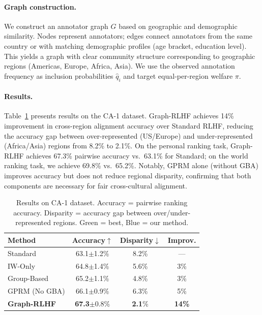 \documentclass{article}
\theoremstyle{plain}
\theoremstyle{definition}
\theoremstyle{remark}
\begin{document}
\paragraph{Graph construction.}
We construct an annotator graph $G$ based on geographic and demographic similarity. Nodes represent annotators; edges connect annotators from the same country or with matching demographic profiles (age bracket, education level). This yields a graph with clear community structure corresponding to geographic regions (Americas, Europe, Africa, Asia). We use the observed annotation frequency as inclusion probabilities $\hat{q}_i$ and target equal-per-region welfare $\pi$.

\paragraph{Results.}
Table~\ref{tab:ca1-results} presents results on the CA-1 dataset. Graph-RLHF achieves 14\% improvement in cross-region alignment accuracy over Standard RLHF, reducing the accuracy gap between over-represented (US/Europe) and under-represented (Africa/Asia) regions from 8.2\% to 2.1\%. On the personal ranking task, Graph-RLHF achieves 67.3\% pairwise accuracy vs.\ 63.1\% for Standard; on the world ranking task, we achieve 69.8\% vs.\ 65.2\%. Notably, GPRM alone (without GBA) improves accuracy but does not reduce regional disparity, confirming that both components are necessary for fair cross-cultural alignment.

\begin{table}[ht]
\caption{Results on CA-1 dataset. Accuracy = pairwise ranking accuracy. Disparity = accuracy gap between over/under-represented regions. \colorbox{bestgreen}{Green} = best, \colorbox{goodblue}{Blue} = our method.}
\label{tab:ca1-results}
\centering
\small
\begin{tabular}{lccc}
\toprule
\textbf{Method} & \textbf{Accuracy}$\uparrow$ & \textbf{Disparity}$\downarrow$ & \textbf{Improv.} \\
\midrule
\cellcolor{neutralgray}Standard & \cellcolor{neutralgray}63.1{\tiny$\pm$1.2}\% & \cellcolor{neutralgray}8.2\% & \cellcolor{neutralgray}--- \\
IW-Only & 64.8{\tiny$\pm$1.4}\% & 5.6\% & 3\% \\
Group-Based & 65.2{\tiny$\pm$1.1}\% & 4.8\% & 3\% \\
GPRM (No GBA) & 66.1{\tiny$\pm$0.9}\% & 6.3\% & 5\% \\
\cellcolor{goodblue}\textbf{Graph-RLHF} & \cellcolor{bestgreen}\textbf{67.3}{\tiny$\pm$0.8}\% & \cellcolor{bestgreen}\textbf{2.1}\% & \cellcolor{bestgreen}\textbf{14\%} \\
\bottomrule
\end{tabular}
\end{table}
\end{document}
